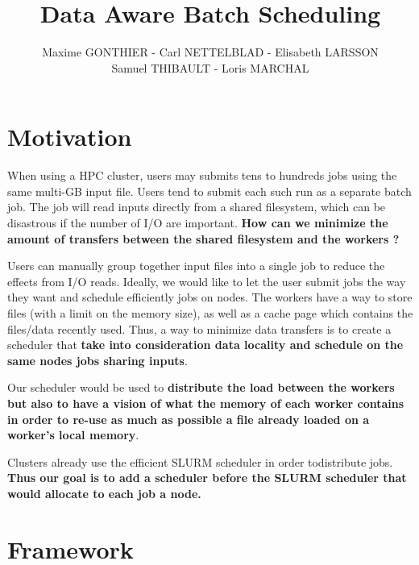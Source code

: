 \documentclass[a4paper]{article}
\title{Data Aware Batch Scheduling}
\author{Maxime GONTHIER - Carl NETTELBLAD - Elisabeth LARSSON \\ Samuel THIBAULT - Loris MARCHAL}
\begin{document}
\maketitle
\tableofcontents
\listoffigures
\newpage


\section{Motivation}

When using a HPC cluster, users may submits tens to hundreds jobs using the same multi-GB input file.
Users tend to submit each such run as a separate batch job.
The job will read inputs directly from a shared filesystem, which can be disastrous if the number of I/O are important.
\textbf{How can we minimize the amount of transfers between the shared filesystem and the workers ?}

Users can manually group together input files into a single job to reduce the effects from I/O reads.
Ideally, we would like to let the user submit jobs the way they want and schedule efficiently jobs on nodes.
The workers have a way to store files (with a limit on the memory size), as well as a cache page which contains the files/data recently used.
Thus, a way to minimize data transfers is to create a scheduler that \textbf{take into consideration data locality and schedule on the same nodes jobs sharing inputs}.

Our scheduler would be used to \textbf{distribute the load between the workers but also to have a vision of what the memory of each worker contains in order to re-use as much as possible a file already loaded on a worker's local memory}.

Clusters already use the efficient SLURM scheduler in order todistribute jobs.
\textbf{Thus our goal is to add a scheduler before the SLURM scheduler that would allocate to each job a node.}

\section{Framework}
\end{document}
